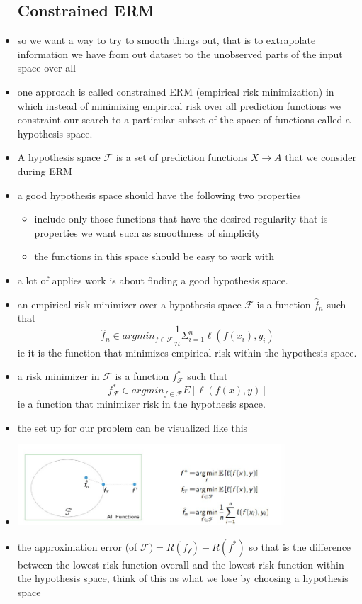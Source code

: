 \documentclass{article}
\begin{document}
\begin{itemize}
\subsection{Constrained ERM}
\item so we want a way to try to smooth things out, that is to extrapolate information we have from out dataset to the unobserved parts of the input space over all 
\item one approach is called constrained  ERM (empirical risk minimization) in which instead of minimizing empirical risk over all prediction functions we constraint our search to a particular subset of the space of functions called a hypothesis space. 
\item A hypothesis space $\mathcal{F}$ is a set of prediction functions $X\rightarrow A$ that we consider during ERM
\item a good hypothesis space should have the following two properties 
\begin{itemize}
    \item include only those functions that have the desired regularity that is properties we want such as smoothness of simplicity
    \item the functions in this space should be easy to work with
\end{itemize}
\item a lot of applies work is about finding a good hypothesis space.
\item an empirical risk minimizer over a hypothesis space $\mathcal{F}$ is a function $\hat{f}_{n}$ such that $$\hat{f}_{n}\in argmin_{f\in \mathcal{F}}\frac{1}{n}\Sigma_{i=1}^{n}\ell(f(x_i),y_i)$$
ie it is the function that minimizes empirical risk within the hypothesis space. 
\item a risk minimizer in $\mathcal{F}$ is a function $f^{*}_{\mathcal{F}}$ such that $$f^{*}_{\mathcal{F}}\in argmin_{f\in \mathcal{F}}E[\ell(f(x),y)]$$
ie a function that minimizer risk in the hypothesis space.
\item the set up for our problem can be visualized like this \item \includegraphics[width=10cm]{lecture_notes/lecture_1/fucntion_sapce.jpg}
\item the approximation error (of $\mathcal{F})=R(f_{\mathcal{f}})-R(f^{*})$ so that is the difference between the lowest risk function overall and the lowest risk function within the hypothesis space, think of this as what we lose by choosing a hypothesis space

\end{itemize}
\end{document}
